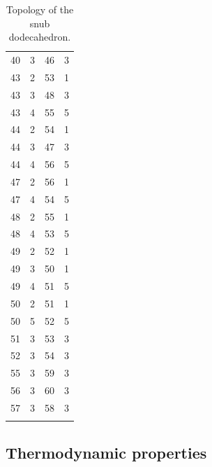 \documentclass[a4paper, amsfonts, amssymb, amsmath, reprint, showkeys, nofootinbib, oneside]{revtex4-1}
\begin{document}
\begin{longtable}[h!]{ cccc }
	40 & 3 & 46 & 3 \\
	43 & 2 & 53 & 1 \\
	43 & 3 & 48 & 3 \\
	43 & 4 & 55 & 5 \\
	44 & 2 & 54 & 1 \\
	44 & 3 & 47 & 3 \\
	44 & 4 & 56 & 5 \\
	47 & 2 & 56 & 1 \\
	47 & 4 & 54 & 5 \\
	48 & 2 & 55 & 1 \\
	48 & 4 & 53 & 5 \\
	49 & 2 & 52 & 1 \\
	49 & 3 & 50 & 1 \\
	49 & 4 & 51 & 5 \\
	50 & 2 & 51 & 1 \\
	50 & 5 & 52 & 5 \\
	51 & 3 & 53 & 3 \\
	52 & 3 & 54 & 3 \\
	55 & 3 & 59 & 3 \\
	56 & 3 & 60 & 3 \\
	57 & 3 & 58 & 3 \\
	\hline
	\caption{Topology of the snub dodecahedron.}
\end{longtable}


\subsection{Thermodynamic properties}
\end{document}
